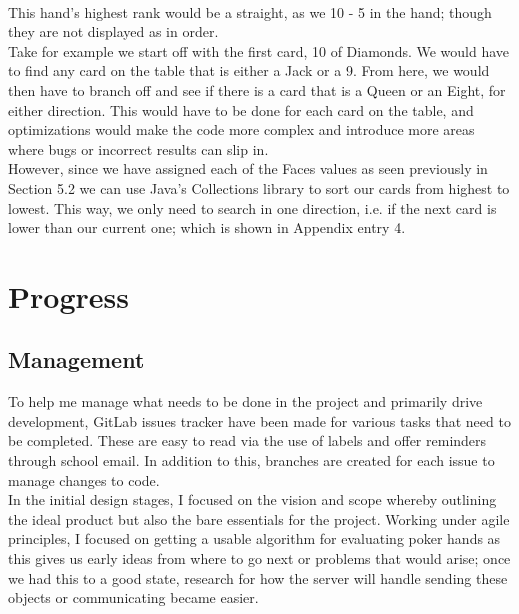 \documentclass[11pt]{article}
\begin{document}
\begin{center}
\tendiamonds \twoclubs \ \ \ \ \ \ \  \eightclubs \ninehearts \sixdiamonds \fiveclubs \sevenspades
\end{center}

This hand's highest rank would be a straight, as we 10 - 5 in the hand; though they are not displayed as in order. \\

Take for example we start off with the first card, 10 of Diamonds. We would have to find any card on the table that is either a Jack or a 9. From here, we would then have to branch off and see if there is a card that is a Queen or an Eight, for either direction. This would have to be done for each card on the table, and optimizations would make the code more complex and introduce more areas where bugs or incorrect results can slip in.\\

However, since we have assigned each of the Faces values as seen previously in Section 5.2 we can use Java's Collections library to sort our cards from highest to lowest. This way, we only need to search in one direction, i.e. if the next card is lower than our current one; which is shown in Appendix entry 4.


\newpage
\section{Progress}
\subsection{Management}

To help me manage what needs to be done in the project and primarily drive development, GitLab issues tracker have been made for various tasks that need to be completed. These are easy to read via the use of labels and offer reminders through school email. In addition to this, branches are created for each issue to manage changes to code.  \\

In the initial design stages, I focused on the vision and scope whereby outlining the ideal product but also the bare essentials for the project. Working under agile principles, I focused on getting a usable algorithm for evaluating poker hands as this gives us early ideas from where to go next or problems that would arise; once we had this to a good state, research for how the server will handle sending these objects or communicating became easier.  \\
\end{document}
